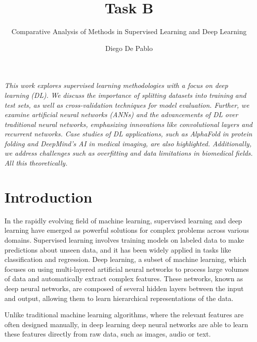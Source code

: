 \documentclass{llncs}
\begin{document}
\title{Task B}
\subtitle{Comparative Analysis of Methods in Supervised Learning and Deep Learning}

\author{Diego De Pablo}

\maketitle 

\vspace{1cm} %

\textit{
	This work explores supervised learning methodologies with a focus on deep learning (DL). We discuss the importance of splitting datasets into training and test sets, as well as cross-validation techniques for model evaluation. Further, we examine artificial neural networks (ANNs) and the advancements of DL over traditional neural networks, emphasizing innovations like convolutional layers and recurrent networks. Case studies of DL applications, such as AlphaFold in protein folding and DeepMind's AI in medical imaging, are also highlighted. Additionally, we address challenges such as overfitting and data limitations in biomedical fields. All this theoretically.}



\section{Introduction}

In the rapidly evolving field of machine learning, supervised learning and deep learning have emerged as powerful solutions for complex problems across various domains. Supervised learning involves training models on labeled data to make predictions about unseen data, and it has been widely applied in tasks like classification and regression. Deep learning, a subset of machine learning, which focuses on using multi-layered artificial neural networks to process large volumes of data and automatically extract complex features. These networks, known as deep neural networks, are composed of several hidden layers between the input and output, allowing them to learn hierarchical representations of the data. \cite{Goodfellow}

Unlike traditional machine learning algorithms, where the relevant features are often designed manually, in deep learning deep neural networks are able to learn these features directly from raw data, such as images, audio or text.\cite{Goodfellow}
\end{document}
